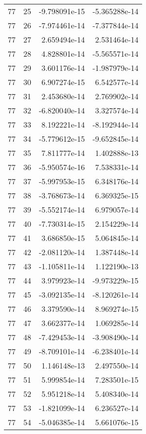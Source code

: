 \begin{tabular}{rrrr}
  77 &   25 & -9.798091e-15 & -5.365288e-14 \\
  77 &   26 & -7.974461e-14 & -7.377844e-14 \\
  77 &   27 &  2.659494e-14 &  2.531464e-14 \\
  77 &   28 &  4.828801e-14 & -5.565571e-14 \\
  77 &   29 &  3.601176e-14 & -1.987979e-14 \\
  77 &   30 &  6.907274e-15 &  6.542577e-14 \\
  77 &   31 &  2.453680e-14 &  2.769902e-14 \\
  77 &   32 & -6.820040e-14 &  3.327574e-14 \\
  77 &   33 &  8.192221e-14 & -8.192944e-14 \\
  77 &   34 & -5.779612e-15 & -9.652845e-14 \\
  77 &   35 &  7.811777e-14 &  1.402888e-13 \\
  77 &   36 & -5.950574e-16 &  7.538331e-14 \\
  77 &   37 & -5.997953e-15 &  6.348176e-14 \\
  77 &   38 & -3.768673e-14 &  6.369325e-15 \\
  77 &   39 & -5.552174e-14 &  6.979057e-14 \\
  77 &   40 & -7.730314e-15 &  2.154229e-14 \\
  77 &   41 &  3.686850e-15 &  5.064845e-14 \\
  77 &   42 & -2.081120e-14 &  1.387448e-14 \\
  77 &   43 & -1.105811e-14 &  1.122190e-13 \\
  77 &   44 &  3.979923e-14 & -9.973229e-15 \\
  77 &   45 & -3.092135e-14 & -8.120261e-14 \\
  77 &   46 &  3.379590e-14 &  8.969274e-15 \\
  77 &   47 &  3.662377e-14 &  1.069285e-14 \\
  77 &   48 & -7.429453e-14 & -3.908490e-14 \\
  77 &   49 & -8.709101e-14 & -6.238401e-14 \\
  77 &   50 &  1.146148e-13 &  2.497550e-14 \\
  77 &   51 &  5.999854e-14 &  7.283501e-15 \\
  77 &   52 &  5.951218e-14 &  5.408340e-14 \\
  77 &   53 & -1.821099e-14 &  6.236527e-14 \\
  77 &   54 & -5.046385e-14 &  5.661076e-15 \\

\end{tabular}
